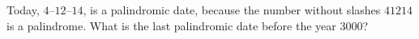 Today, $\text{4--12--14}$, is a palindromic date, because the number without slashes $41214$ is a palindrome. What is the last palindromic date before the year $3000$?
